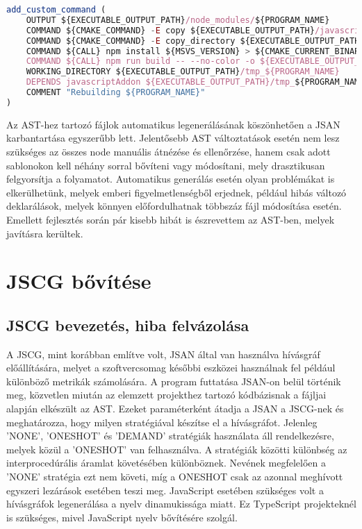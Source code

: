 \begin{lstlisting}[caption={JSAN Cmake utasítások},label={lst:jsancmake}, language={JavaScript}, basicstyle=\fontsize{9}{11}\selectfont\ttfamily]
add_custom_command (
    OUTPUT ${EXECUTABLE_OUTPUT_PATH}/node_modules/${PROGRAM_NAME}
    COMMAND ${CMAKE_COMMAND} -E copy ${EXECUTABLE_OUTPUT_PATH}/javascriptAddon.node ${EXECUTABLE_OUTPUT_PATH}/tmp_${PROGRAM_NAME}/
    COMMAND ${CMAKE_COMMAND} -E copy_directory ${EXECUTABLE_OUTPUT_PATH}/../lib/javascript/addon/ast ${EXECUTABLE_OUTPUT_PATH}/tmp_${PROGRAM_NAME}/src/ast/
    COMMAND ${CALL} npm install ${MSVS_VERSION} > ${CMAKE_CURRENT_BINARY_DIR}/${PROGRAM_NAME}-npm-install.log 2>&1
    COMMAND ${CALL} npm run build -- --no-color -o ${EXECUTABLE_OUTPUT_PATH}/node_modules/${PROGRAM_NAME} > ${CMAKE_CURRENT_BINARY_DIR}/${PROGRAM_NAME}-npm-build.log 2>&1
    WORKING_DIRECTORY ${EXECUTABLE_OUTPUT_PATH}/tmp_${PROGRAM_NAME}
    DEPENDS javascriptAddon ${EXECUTABLE_OUTPUT_PATH}/tmp_${PROGRAM_NAME}
    COMMENT "Rebuilding ${PROGRAM_NAME}"
)
\end{lstlisting}

Az AST-hez tartozó fájlok automatikus legenerálásának köszönhetően a JSAN karbantartása egyszerűbb lett. Jelentősebb AST változtatások esetén nem lesz szükséges az összes node manuális átnézése és ellenőrzése, hanem csak adott sablonokon kell néhány sorral bővíteni vagy módosítani, mely drasztikusan felgyorsítja a folyamatot. Automatikus generálás esetén olyan problémákat is elkerülhetünk, melyek emberi figyelmetlenségből erjednek, például hibás változó deklarálások, melyek könnyen előfordulhatnak többszáz fájl módosítása esetén. Emellett fejlesztés során pár kisebb hibát is észrevettem az AST-ben, melyek javításra kerültek. 

\section{JSCG bővítése}

\subsection{JSCG bevezetés, hiba felvázolása}
A JSCG, mint korábban említve volt, JSAN által van használva hívásgráf előállítására, melyet a szoftvercsomag későbbi eszközei használnak fel például különböző metrikák számolására. A program futtatása JSAN-on belül történik meg, közvetlen miután az elemzett projekthez tartozó kódbázisnak a fájljai alapján elkészült az AST. Ezeket paraméterként átadja a JSAN a JSCG-nek és meghatározza, hogy milyen stratégiával készítse el a hívásgráfot. Jelenleg 'NONE', 'ONESHOT' és 'DEMAND' stratégiák használata áll rendelkezésre, melyek közül a 'ONESHOT' van felhasználva. A stratégiák közötti különbség az interprocedúrális áramlat követésében különböznek. Nevének megfelelően a 'NONE' stratégia ezt nem követi, míg a ONESHOT csak az azonnal meghívott egyszeri lezárások esetében teszi meg.
JavaScript esetében szükséges volt a hívásgráfok legenerálása a nyelv dinamukissága miatt\cite{feldthaus2013efficient}. Ez TypeScript projekteknél is szükséges, mivel JavaScript nyelv bővítésére szolgál.

